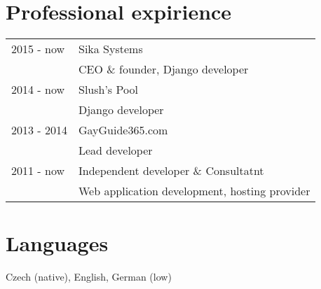 \documentclass[12pt,a4paper]{article}
\begin{document}
\section*{Professional expirience}
\begin{tabular}{@{}p{2cm}l}
2015 - now & Sika Systems\\
 & CEO \& founder, Django developer\\
2014 - now & Slush's Pool\\
 & Django developer\\
2013 - 2014 & GayGuide365.com\\
 & Lead developer\\
2011 - now & Independent developer \& Consultatnt\\
 & Web application development, hosting provider\\
\end{tabular}

\section*{Languages}
Czech (native), English, German (low)\\
\end{document}
